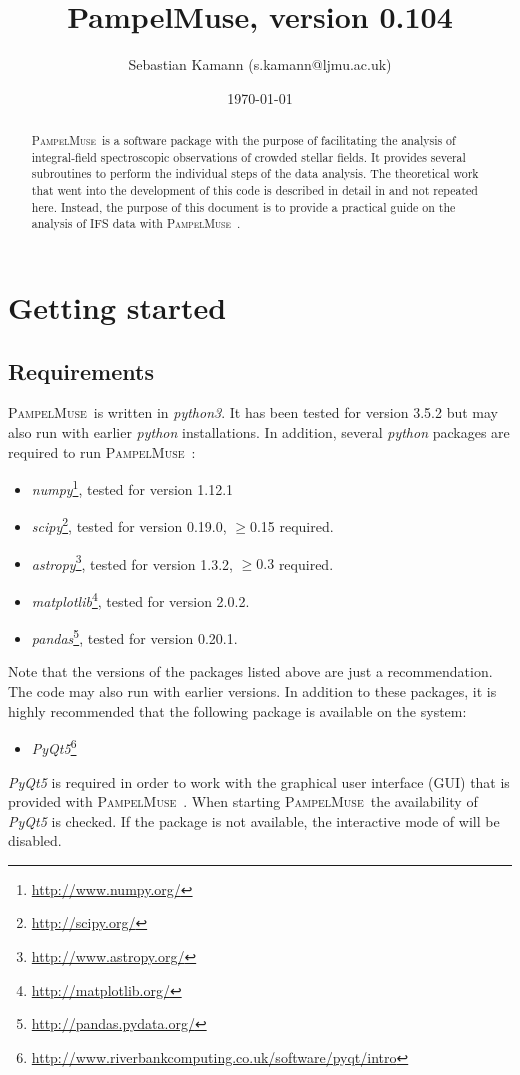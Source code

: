 \documentclass[a4paper,10pt]{article}
\title{PampelMuse, version 0.104}
\author{Sebastian Kamann (s.kamann@ljmu.ac.uk)}
\date{\today}
\newcommand{\pampelmuse}{\textsc{PampelMuse}\ }
\begin{document}
\maketitle
\graphicspath{{./../images/}}

\begin{abstract}
 \pampelmuse is a software package with the purpose of facilitating the analysis of integral-field spectroscopic observations of crowded stellar fields. It provides several  subroutines to perform the individual steps of the data analysis. The theoretical work that went into the development of this code is described in detail in \citet{2013A&A...549A..71K} and not repeated here. Instead, the purpose of this document is to provide a practical guide on the analysis of IFS data with \pampelmuse.
\end{abstract}

\clearpage

\tableofcontents
\clearpage

\section{Getting started}
 
\subsection{Requirements}

\pampelmuse is written in \textit{python3}. It has been tested for version 3.5.2 but may also run with earlier \textit{python} installations. In addition, several \textit{python} packages are required to run \pampelmuse:
\begin{itemize}
 \item \textit{numpy}\footnote{\url{http://www.numpy.org/}}, tested for version 1.12.1
 \item \textit{scipy}\footnote{\url{http://scipy.org/}}, tested for version 0.19.0, $\geq$0.15 required.
 \item \textit{astropy}\footnote{\url{http://www.astropy.org/}}, tested for version 1.3.2, $\geq0.3$ required.
 \item \textit{matplotlib}\footnote{\url{http://matplotlib.org/}}, tested for version 2.0.2.
 \item \textit{pandas}\footnote{\url{http://pandas.pydata.org/}}, tested for version 0.20.1.
\end{itemize}
Note that the versions of the packages listed above are just a recommendation. The code may also run with earlier versions. In addition to these packages, it is highly recommended that the following package is available on the system:
\begin{itemize}
 \item \textit{PyQt5}\footnote{\url{http://www.riverbankcomputing.co.uk/software/pyqt/intro}}
\end{itemize}
\textit{PyQt5} is required in order to work with the graphical user interface (GUI) that is provided with \pampelmuse. When starting \pampelmuse the availability of \textit{PyQt5} is checked. If the package is not available, the interactive mode of will be disabled.
\end{document}
